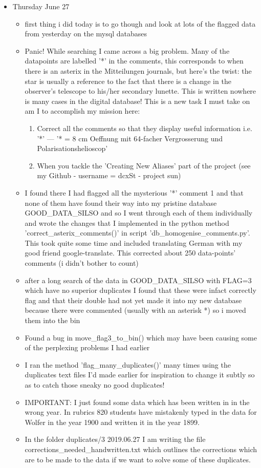 \documentclass[12pt]{article}
\begin{document}
\begin{itemize}
\item Thursday June 27
    \begin{itemize}
        \item first thing i did today is to go though and look at lots of the flagged data from yesterday on the mysql databases
        \item Panic! While searching I came across a big problem. Many of the datapoints are labelled '*' in the comments, this corresponds to when there is an asterix in the Mitteilungen journals, but here's the twist: the star is usually a reference to the fact that there is a change in the observer's telescope to his/her secondary lunette. This is written nowhere is many cases in the digital database! This is a new task I must take on am I to accomplish my mission here:
        \begin{enumerate}
            \item Correct all the comments so that they display useful information i.e. '*' --- '* = 8 cm Oeffnung mit 64-facher Vergrosserung und Polarisationshelioscop'
            \item When you tackle the 'Creating New Aliases' part of the project (see my Github - username = dcxSt - project sun)
        \end{enumerate}
        \item I found there I had flagged all the mysterious '*' comment 1 and that none of them have found their way into my pristine database GOOD\_DATA\_SILSO and so I went through each of them individually and wrote the changes that I implemented in the python method 'correct\_asterix\_comments()' in script 'db\_homogenise\_comments.py'. This took quite some time and included translating German with my good friend google-translate. This corrected about 250 data-points' comments (i didn't bother to count)
        \item after a long search of the data in GOOD\_DATA\_SILSO with FLAG=3 which have no superior duplicates I found that these were infact correctly flag and that their double had not yet made it into my new database because there were commented (usually with an asterisk *) so i moved them into the bin
        \item Found a bug in move\_flag3\_to\_bin() which may have been causing some of the perplexing problems I had earlier
        \item I ran the method 'flag\_many\_duplicates()' many times using the duplicates text files I'd made earlier for inspiration to change it subtly so as to catch those sneaky no good duplicates!
        \item IMPORTANT: I just found some data which has been written in in the wrong year. In rubrics 820 students have mistakenly typed in the data for Wolfer in the year 1900 and written it in the year 1899.
        \item In the folder duplicates/3 2019.06.27 I am writing the file corrections\_needed\_handwritten.txt which outlines the corrections which are to be made to the data if we want to solve some of these duplicates.
    \end{itemize}
    

\end{itemize}
\end{document}
